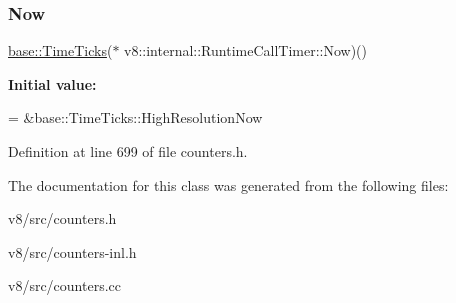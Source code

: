 \subsubsection{\texorpdfstring{Now}{Now}}
{\footnotesize\ttfamily \mbox{\hyperlink{classv8_1_1base_1_1TimeTicks}{base\+::\+Time\+Ticks}}($\ast$ v8\+::internal\+::\+Runtime\+Call\+Timer\+::\+Now)()\hspace{0.3cm}{\ttfamily [static]}}

{\bfseries Initial value\+:}
\begin{DoxyCode}
=
    &base::TimeTicks::HighResolutionNow
\end{DoxyCode}


Definition at line 699 of file counters.\+h.



The documentation for this class was generated from the following files\+:\begin{DoxyCompactItemize}
\item 
v8/src/counters.\+h\item 
v8/src/counters-\/inl.\+h\item 
v8/src/counters.\+cc\end{DoxyCompactItemize}
